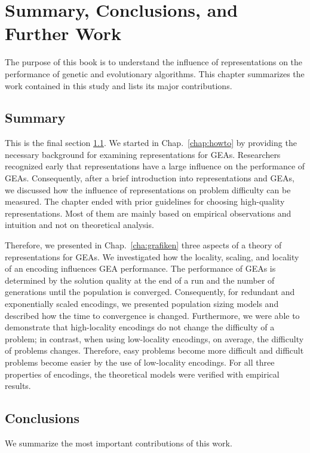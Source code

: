 \chapter{Summary, Conclusions, and Further Work}
\label{chap:conclusions}
The purpose of this book is to understand  the influence of representations on the performance of genetic and evolutionary algorithms. 
This chapter summarizes the work contained in this study and lists its major contributions.


\section{Summary}
\label{sec:summary}

This is the final section \ref{sec:summary}. We  started in Chap.~\ref{chap:howto} by providing the necessary background for examining representations for  GEAs. Researchers recognized early that representations have a large influence on the performance of GEAs. Consequently, after a brief introduction into representations and GEAs, we discussed how the influence of representations on problem difficulty  can be measured. The chapter ended with prior guidelines for choosing high-quality  representations. Most of them are  mainly based on empirical observations and intuition and not on theoretical analysis.

Therefore, we presented in Chap.~\ref{cha:grafiken} three aspects of a theory of representations for  GEAs. We investigated how the locality, scaling, and locality of an encoding  influences GEA performance. The performance of GEAs is determined by the solution quality at the end of a run and the number of generations until the population is converged. Consequently, for redundant and exponentially scaled encodings, we presented population sizing models and described how the time to convergence is changed.
Furthermore, we were able to demonstrate that high-locality encodings do not change the difficulty of a problem; in contrast, when using low-locality encodings, on average, the difficulty of problems changes. Therefore,  easy problems become more difficult and difficult problems become easier by the use of low-locality encodings.
For all three properties of encodings, the theoretical models were verified with empirical results.


\section{Conclusions}
We  summarize the most important contributions of this work.

